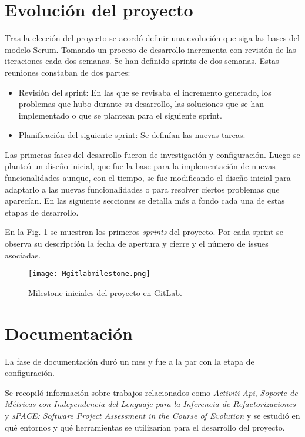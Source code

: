 \section{Evolución del proyecto}
Tras la elección del proyecto se acordó definir una evolución que siga las bases del modelo Scrum. Tomando un proceso de desarrollo incrementa con revisión de las iteraciones cada dos semanas.
Se han definido sprints de dos semanas. Estas reuniones constaban de dos partes:
\begin{itemize}
	\item Revisión del sprint: En las que se revisaba el incremento generado, los problemas que hubo durante su desarrollo, las soluciones que se han implementado o que se plantean para el siguiente sprint.
	\item Planificación del siguiente sprint: Se definían las nuevas tareas.
\end{itemize}
Las primeras fases del desarrollo fueron de investigación y configuración. Luego se planteó un diseño inicial, que fue la base para la implementación de nuevas funcionalidades aunque, con el tiempo, se fue modificando el diseño inicial para adaptarlo a las nuevas funcionalidades o para resolver ciertos problemas que aparecían. En las siguiente secciones se detalla más a fondo cada una de estas etapas de desarrollo.

En la Fig. \ref{fig:Mgitlabmilestone} se muestran los primeros \textit{sprints} del proyecto. Por cada sprint se observa su descripción la fecha de apertura y cierre y el número de issues asociadas. 

\begin{figure}[!h]
	\centering
	\texttt{[image: Mgitlabmilestone.png]}
	\caption{Milestone iniciales del proyecto en GitLab.}
	\label{fig:Mgitlabmilestone}
\end{figure}

\section{Documentación}
La fase de documentación duró un mes y fue a la par con la etapa de configuración. 

Se recopiló información sobre trabajos relacionados como \textit{Activiti-Api}\cite{rlp0019_software_2019}, \textit{Soporte de Métricas con Independencia del Lenguaje para la Inferencia de Refactorizaciones} \cite{marticorena_soporte_2005} y \textit{sPACE: Software Project Assessment in the Course of Evolution} \cite{ratzinger_space:_2007} y se estudió en qué entornos y qué herramientas se utilizarían para el desarrollo del proyecto.

